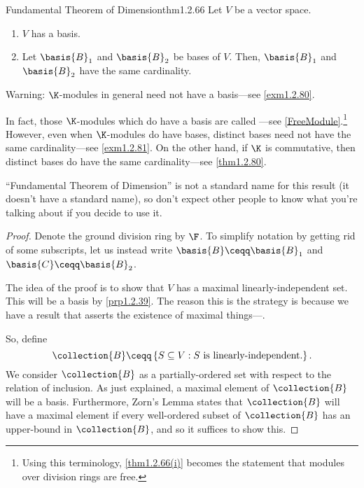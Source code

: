 \begin{thm}{Fundamental Theorem of Dimension}{thm1.2.66}
	Let $V$ be a vector space.
	\begin{enumerate}
		\item \label{thm1.2.66(i)}$V$ has a basis.
		\item \label{thm1.2.66(ii)}Let $\basis{B}_1$ and $\basis{B}_2$ be bases of $V$.  Then, $\basis{B}_1$ and $\basis{B}_2$ have the same cardinality.
	\end{enumerate}
	\begin{rmk}
		Warning:  $\K$-modules in general need not have a basis---see \cref{exm1.2.80}.
	\end{rmk}
	\begin{rmk}
		In fact, those $\K$-modules which do have a basis are called ---see \cref{FreeModule}.\footnote{Using this terminology, \cref{thm1.2.66(i)} becomes the statement that modules over division rings are free.}  However, even when $\K$-modules do have bases, distinct bases need not have the same cardinality---see \cref{exm1.2.81}.  On the other hand, if $\K$ is commutative, then distinct bases do have the same cardinality---see \cref{thm1.2.80}.
	\end{rmk}
	\begin{rmk}
		``Fundamental Theorem of Dimension'' is not a standard name for this result (it doesn't have a standard name), so don't expect other people to know what you're talking about if you decide to use it.
	\end{rmk}
	\begin{proof}
		Denote the ground division ring by $\F$.  To simplify notation by getting rid of some subscripts, let us instead write $\basis{B}\ceqq \basis{B}_1$ and $\basis{C}\ceqq \basis{B}_2$.
		
		The idea of the proof is to show that $V$ has a maximal linearly-independent set.  This will be a basis by \cref{prp1.2.39}.  The reason this is the strategy is because we have a result that asserts the existence of maximal things---\emph{}.
		
		So, define
		\begin{equation}
			\collection{B}\ceqq \left\{ S\subseteq V:S\text{ is linearly-independent.}\right\} .
		\end{equation}
		We consider $\collection{B}$ as a partially-ordered set with respect to the relation of inclusion.  As just explained, a maximal element of $\collection{B}$ will be a basis.  Furthermore, Zorn's Lemma states that $\collection{B}$ will have a maximal element if every well-ordered subset of $\collection{B}$ has an upper-bound in $\collection{B}$, and so it suffices to show this.
		

\end{proof}
\end{thm}
